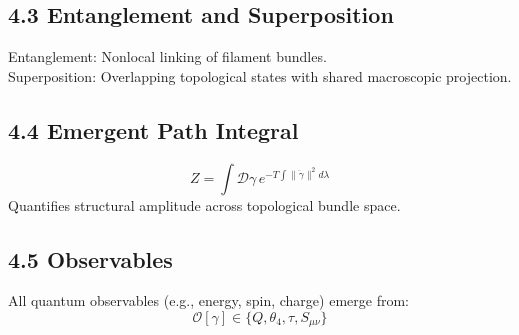 \documentclass[12pt]{article}
\begin{document}
\subsection*{4.3 Entanglement and Superposition}
Entanglement: Nonlocal linking of filament bundles.\\
Superposition: Overlapping topological states with shared macroscopic projection.

\subsection*{4.4 Emergent Path Integral}
\[
Z = \int \mathcal{D}\gamma \, e^{-T \int \|\ddot{\gamma}\|^2 d\lambda}
\]
Quantifies structural amplitude across topological bundle space.

\subsection*{4.5 Observables}
All quantum observables (e.g., energy, spin, charge) emerge from:
\[
\mathcal{O}[\gamma] \in \{Q, \theta_4, \tau, S_{\mu\nu}\}
\]
\end{document}

